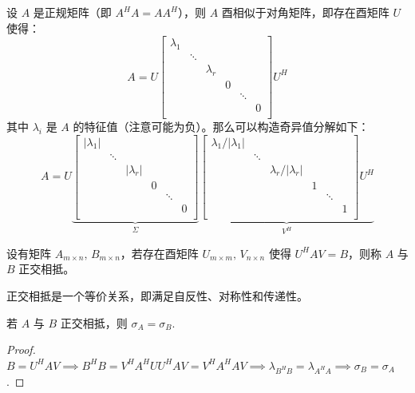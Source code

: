 \begin{theorem}[正规矩阵的奇异值分解]
设 $A$ 是正规矩阵（即 $A^HA=AA^H$），则 $A$ 酉相似于对角矩阵，即存在酉矩阵 $U$ 使得：
\[
    A=U\begin{bmatrix}
    \lambda_1&&&&&\\
    &\ddots&&&&\\
    &&\lambda_r&&&\\
    &&&0&&\\
    &&&&\ddots&\\
    &&&&&0\\
    \end{bmatrix}U^H
\]
其中 $\lambda_i$ 是 $A$ 的特征值（注意可能为负）。那么可以构造奇异值分解如下：
\[
    A=U\underbrace{\begin{bmatrix}
    |\lambda_1|&&&&&\\
    &\ddots&&&&\\
    &&|\lambda_r|&&&\\
    &&&0&&\\
    &&&&\ddots&\\
    &&&&&0\\
    \end{bmatrix}}_{\Sigma}
    \underbrace{\begin{bmatrix}
    \lambda_1/|\lambda_1|&&&&&\\
    &\ddots&&&&\\
    &&\lambda_r/|\lambda_r|&&&\\
    &&&1&&\\
    &&&&\ddots&\\
    &&&&&1\\
    \end{bmatrix}U^H}_{V^H}
\]
\end{theorem}


\begin{definition}[正交相抵]
设有矩阵 $A_{m\times n},\,B_{m\times n}$，若存在酉矩阵 $U_{m\times m},\,V_{n\times n}$ 使得 $U^HAV=B$，则称 $A$ 与 $B$ 正交相抵。
\end{definition}

\begin{property}
正交相抵是一个等价关系，即满足自反性、对称性和传递性。
\end{property}

\begin{theorem}
若 $A$ 与 $B$ 正交相抵，则 $\sigma_A=\sigma_B$.
\end{theorem}
\begin{proof}
$B=U^HAV\implies B^HB=V^HA^HUU^HAV=V^HA^HAV\implies\lambda_{B^HB}=\lambda_{A^HA}\implies \sigma_B=\sigma_A$.
\end{proof}
